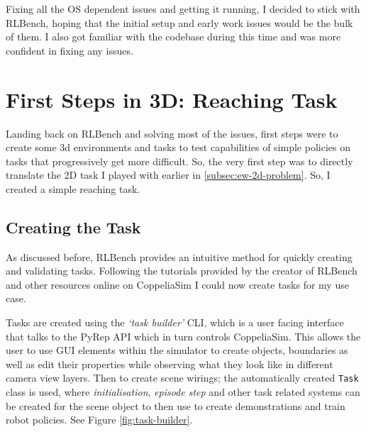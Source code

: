 Fixing all the OS dependent issues and getting it running, I decided to stick with RLBench, hoping that the initial setup and early work issues would be the bulk of them. I also got familiar with the codebase during this time and was more confident in fixing any issues.

\section{First Steps in 3D: Reaching Task}\label{sec:3d-reaching-tasks}
Landing back on RLBench and solving most of the issues, first steps were to create some 3d environments and tasks to test capabilities of simple policies on tasks that progressively get more difficult. So, the very first step was to directly translate the 2D task I played with earlier in \ref{subsec:ew-2d-problem}. So, I created a simple reaching task. 

\subsection{Creating the Task}
As discussed before, RLBench provides an intuitive method for quickly creating and validating tasks. Following the tutorials provided by the creator of RLBench and other resources online on CoppeliaSim  I could now create tasks for my use case.

Tasks are created using the \emph{`task builder'} CLI, which is a user facing interface that talks to the PyRep API which in turn controls CoppeliaSim. This allows the user to use GUI elements within the simulator to create objects, boundaries as well as edit their properties while observing what they look like in different camera view layers. Then to create scene wirings; the automatically created \verb|Task| class is used, where \emph{initialisation}, \emph{episode step} and other task related systems can be created for the scene object to then use to create demonstrations and train robot policies. See Figure \ref{fig:task-builder}.

